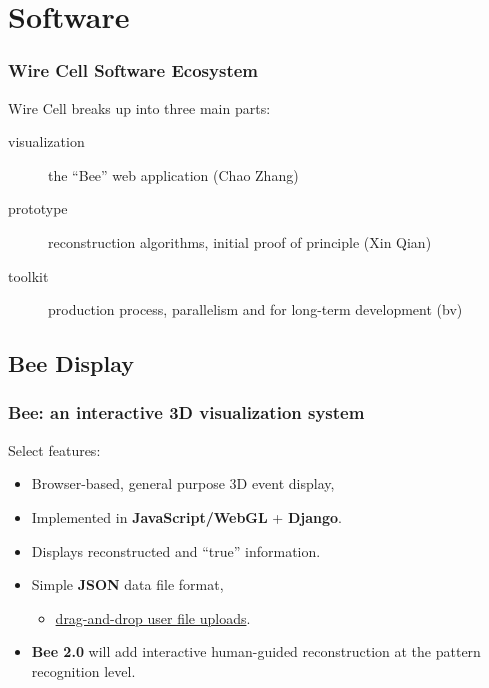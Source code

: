 \section{Software}

\begin{frame}
\end{frame}


\begin{frame}
  \frametitle{Wire Cell Software Ecosystem}

  Wire Cell breaks up into three main parts:

  \begin{description}
  \item[visualization] the ``Bee'' web application (Chao Zhang)
  \item[prototype] reconstruction algorithms, initial proof of
    principle (Xin Qian)
  \item[toolkit] production process, parallelism and for long-term development (bv)
  \end{description}

\end{frame}

\subsection{Bee Display}

\begin{frame}
  \frametitle{Bee: an interactive 3D visualization system}

  Select features:
  \begin{itemize}
  \item Browser-based, general purpose 3D event display, 
  \item Implemented in \textbf{JavaScript/WebGL} + \textbf{Django}.
  \item Displays reconstructed and ``true'' information.
  \item Simple \textbf{JSON} data file format, 
    \begin{itemize}
    \item \href{http://bnlif.github.io/wire-cell-docs/viz/uploads/}{drag-and-drop user
      file uploads}.
    \end{itemize}
  \item \textbf{Bee 2.0} will add interactive human-guided
    reconstruction at the pattern recognition level.
  \end{itemize}
\end{frame}

